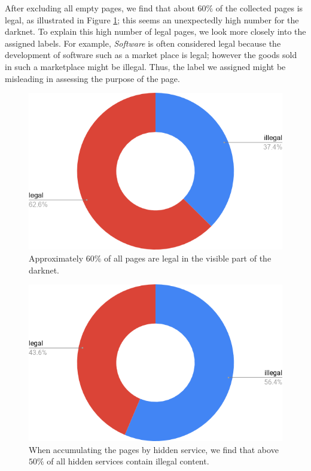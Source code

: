 After excluding all empty pages, we find that about $60\%$ of the collected pages is legal, as illustrated in Figure \ref{fig:legalByContent}; this seems an unexpectedly high number for the darknet. To explain this high number of legal pages, we look more closely into the assigned labels. 
For example, \emph{Software} is often considered legal because the development of software such as a market place is legal; however the goods sold in such a marketplace might be illegal. Thus, the label we assigned might be misleading in assessing the purpose of the page.

\begin{figure}[H]
    \includegraphics[width=\linewidth]{images/legalByContent.png}
    \caption{Approximately $60\%$ of all pages are legal in the visible part of the darknet.}
    \label{fig:legalByContent}
\end{figure}

\begin{figure}[H]
    \includegraphics[width=\linewidth]{images/legalByHost.png}
    \caption{When accumulating the pages by hidden service, we find that above $50\%$ of all hidden services contain illegal content.}
    \label{fig:legalByHost}
\end{figure}


